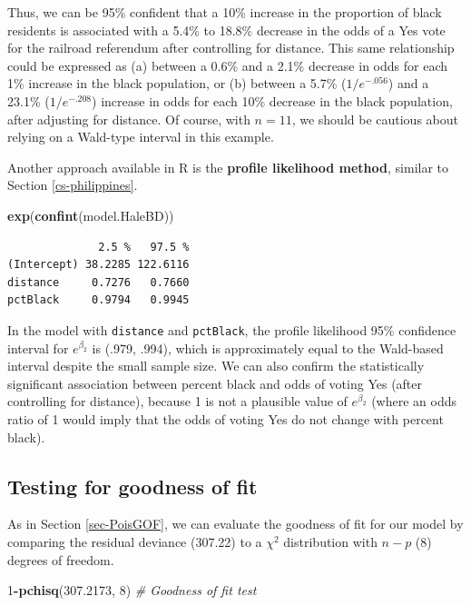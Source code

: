 \documentclass[
]{krantz}
\newenvironment{Shaded}{\begin{snugshade}}{\end{snugshade}}
\newcommand{\CommentTok}[1]{\textcolor[rgb]{0.37,0.37,0.37}{\textit{#1}}}
\newcommand{\DecValTok}[1]{\textcolor[rgb]{0.06,0.06,0.06}{#1}}
\newcommand{\FloatTok}[1]{\textcolor[rgb]{0.06,0.06,0.06}{#1}}
\newcommand{\KeywordTok}[1]{\textcolor[rgb]{0.27,0.27,0.27}{\textbf{#1}}}
\newcommand{\NormalTok}[1]{#1}
\newcommand{\OperatorTok}[1]{\textcolor[rgb]{0.43,0.43,0.43}{\textbf{#1}}}
\begin{document}
Thus, we can be 95\% confident that a 10\% increase in the proportion of black residents is associated with a 5.4\% to 18.8\% decrease in the odds of a Yes vote for the railroad referendum after controlling for distance. This same relationship could be expressed as (a) between a 0.6\% and a 2.1\% decrease in odds for each 1\% increase in the black population, or (b) between a 5.7\% (\(1/e^{-.056}\)) and a 23.1\% (\(1/e^{-.208}\)) increase in odds for each 10\% decrease in the black population, after adjusting for distance. Of course, with \(n=11\), we should be cautious about relying on a Wald-type interval in this example.

Another approach available in R is the \textbf{profile likelihood method},  similar to Section \ref{cs-philippines}.

\begin{Shaded}
\begin{Highlighting}[]
\KeywordTok{exp}\NormalTok{(}\KeywordTok{confint}\NormalTok{(model.HaleBD))}
\end{Highlighting}
\end{Shaded}

\begin{verbatim}
              2.5 %   97.5 %
(Intercept) 38.2285 122.6116
distance     0.7276   0.7660
pctBlack     0.9794   0.9945
\end{verbatim}

In the model with \texttt{distance} and \texttt{pctBlack}, the profile likelihood 95\% confidence interval for \(e^{\beta_2}\) is (.979, .994), which is approximately equal to the Wald-based interval despite the small sample size. We can also confirm the statistically significant association between percent black and odds of voting Yes (after controlling for distance), because 1 is not a plausible value of \(e^{\beta_2}\) (where an odds ratio of 1 would imply that the odds of voting Yes do not change with percent black).

\hypertarget{testing-for-goodness-of-fit}{%
\subsection{Testing for goodness of fit}\label{testing-for-goodness-of-fit}}

As in Section \ref{sec-PoisGOF}, we can evaluate the goodness of fit for our model by comparing the residual deviance (307.22) to a \(\chi^2\) distribution with \(n-p\) (8) degrees of freedom.

\begin{Shaded}
\begin{Highlighting}[]
\DecValTok{1}\OperatorTok{-}\KeywordTok{pchisq}\NormalTok{(}\FloatTok{307.2173}\NormalTok{, }\DecValTok{8}\NormalTok{)  }\CommentTok{# Goodness of fit test}
\end{Highlighting}
\end{Shaded}
\end{document}
